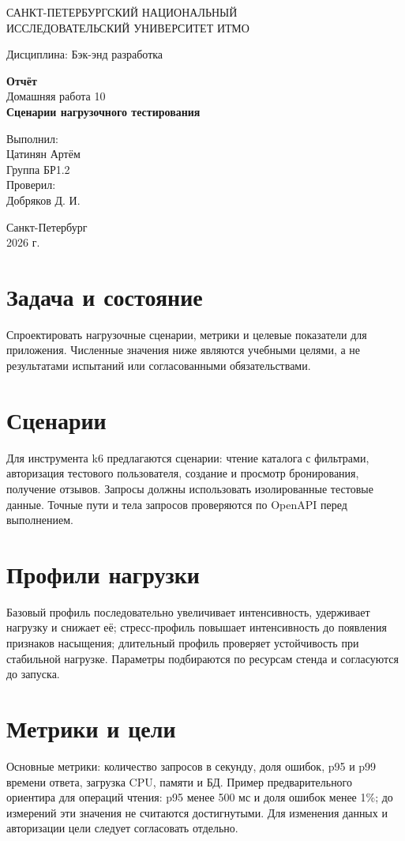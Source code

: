 \documentclass[14pt,a4paper]{extarticle}
\begin{document}
\begin{titlepage}\begin{center}
САНКТ-ПЕТЕРБУРГСКИЙ НАЦИОНАЛЬНЫЙ\\ ИССЛЕДОВАТЕЛЬСКИЙ УНИВЕРСИТЕТ ИТМО
\vspace{1.5cm}

Дисциплина: Бэк-энд разработка
\vspace{1.5cm}

\textbf{Отчёт}\\[0.5cm]
Домашняя работа 10\\[0.5cm]
\textbf{Сценарии нагрузочного тестирования}
\vfill
\begin{flushright}Выполнил:\\ Цатинян Артём\\ Группа БР1.2\\[0.8cm] Проверил:\\ Добряков Д. И.\end{flushright}
\vfill Санкт-Петербург\\ 2026 г.\end{center}\end{titlepage}
\section{Задача и состояние}
Спроектировать нагрузочные сценарии, метрики и целевые показатели для приложения. Численные значения ниже являются учебными целями, а не результатами испытаний или согласованными обязательствами.
\section{Сценарии}
Для инструмента k6 предлагаются сценарии: чтение каталога с фильтрами, авторизация тестового пользователя, создание и просмотр бронирования, получение отзывов. Запросы должны использовать изолированные тестовые данные. Точные пути и тела запросов проверяются по OpenAPI перед выполнением.
\section{Профили нагрузки}
Базовый профиль последовательно увеличивает интенсивность, удерживает нагрузку и снижает её; стресс-профиль повышает интенсивность до появления признаков насыщения; длительный профиль проверяет устойчивость при стабильной нагрузке. Параметры подбираются по ресурсам стенда и согласуются до запуска.
\section{Метрики и цели}
Основные метрики: количество запросов в секунду, доля ошибок, p95 и p99 времени ответа, загрузка CPU, памяти и БД. Пример предварительного ориентира для операций чтения: p95 менее 500 мс и доля ошибок менее 1\%; до измерений эти значения не считаются достигнутыми. Для изменения данных и авторизации цели следует согласовать отдельно.
\end{document}
